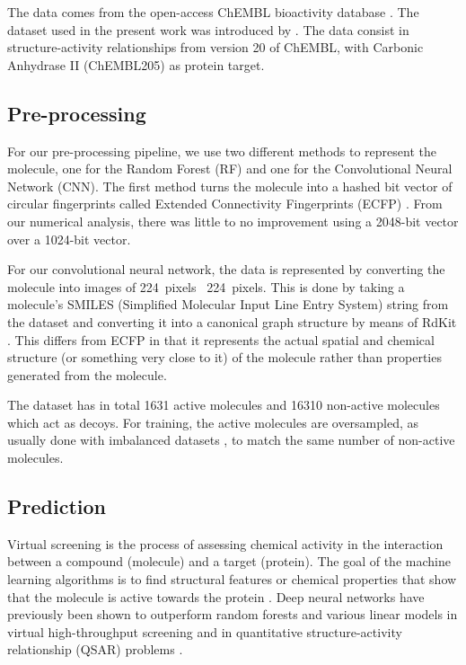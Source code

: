 \documentclass[a4paper,12pt,%
onecolumn,oneside,article,%
british%
]{memoir}
\renewcommand*{\|}[1][]{\nonscript\:#1\vert\nonscript\:\mathopen{}}
\begin{document}
The data comes from the open-access ChEMBL bioactivity database \autocites{bentoetal2014}. The dataset used in the present work was introduced by \textcite{koutsoukasetal2017}. The data consist in structure-activity relationships from version 20 of ChEMBL, with Carbonic Anhydrase II (ChEMBL205) as protein target.


\subsection{Pre-processing} 

For our pre-processing pipeline, we use two different methods to represent the molecule, one for the Random Forest (RF) and one for the Convolutional Neural Network (CNN). The first method turns the molecule into a hashed bit vector of circular fingerprints called Extended Connectivity Fingerprints (ECFP) \autocites{rogersetal2010}. From our numerical analysis, there was little to no improvement using a 2048-bit vector over a 1024-bit vector. 
  
For our convolutional neural network, the data is represented by converting the molecule into images of 224~pixels \texttimes\ 224~pixels. This is done by taking a molecule's SMILES (Simplified Molecular Input Line Entry System) string \autocites{davidetal2020} from the dataset and converting it into a canonical graph structure by means of RdKit \autocites{rdkit2017}. This differs from ECFP in that it represents the actual spatial and chemical structure (or something very close to it) of the molecule rather than properties generated from the molecule.

The dataset has in total 1631 active molecules and 16310 non-active molecules which act as decoys. For training, the active molecules are oversampled, as usually done with imbalanced datasets \autocites{provost2000}, to match the same number of non-active molecules.

\subsection{Prediction}

Virtual screening is the process of assessing chemical activity in the interaction between a compound (molecule) and a target (protein). The goal of the machine learning algorithms is to find structural features or chemical properties that show that the molecule is active towards the protein \autocites{green2019}. Deep neural networks have previously been shown to outperform random forests and various linear models in virtual high-throughput screening and in quantitative structure-activity relationship (QSAR) problems \autocite{koutsoukasetal2017}.
  
\end{document}

